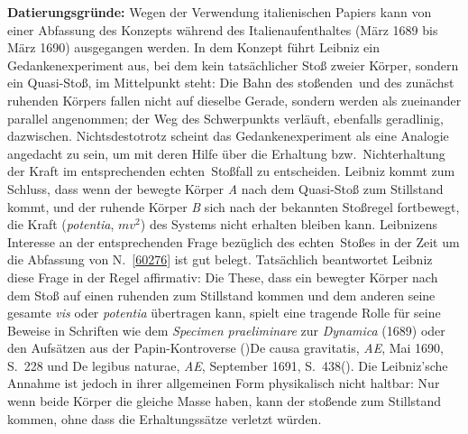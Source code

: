\begin{ledgroup}
\footnotesize
\pstart
\noindent%
\textbf{Datierungsgründe:}
Wegen der Verwendung italienischen Papiers kann von einer Abfassung des Konzepts während des Italienaufenthaltes (März 1689 bis März 1690) ausgegangen werden.
%
\pend
%
\pstart
In dem Konzept führt Leibniz ein Gedankenexperiment aus, bei dem kein tatsächlicher Stoß zweier Körper,
%
sondern ein \glqq Quasi-Stoß\grqq, im Mittelpunkt steht: 
%
Die Bahn des \glqq stoßenden\grqq\  und des zunächst ruhenden Körpers fallen nicht auf dieselbe Gerade,
%
sondern werden als zueinander parallel angenommen; 
%
der Weg des Schwerpunkts verläuft, ebenfalls geradlinig, dazwischen.
%
Nichtsdestotrotz scheint das Gedankenexperiment als eine Analogie angedacht zu sein,
%
um mit deren Hilfe über die Erhaltung bzw.\ Nichterhaltung der Kraft im entsprechenden \glqq echten\grqq\ Stoßfall zu entscheiden.
%
Leibniz kommt zum Schluss, dass wenn der bewegte Körper \textit{A} nach dem Quasi-Stoß
%
zum Stillstand kommt, und der ruhende Körper \textit{B} sich nach der bekannten Stoßregel fortbewegt,
%
die Kraft (\textit{potentia}, $mv^2$) des Systems nicht erhalten bleiben kann.
%
Leibnizens Interesse an der entsprechenden Frage bezüglich des \glqq echten\grqq\ Stoßes in der Zeit um
%
die Abfassung von N.~\ref{60276} ist gut belegt. 
%
Tatsächlich beantwortet Leibniz diese Frage in der Regel affirmativ: Die These, dass ein bewegter Körper 
%
nach dem Stoß auf einen ruhenden zum Stillstand kommen und dem anderen seine gesamte \textit{vis} oder \textit{potentia} übertragen kann,
%
spielt eine tragende Rolle für seine Beweise in Schriften wie dem
%
\textit{Specimen praeliminare} zur \cite{01354}\textit{Dynamica} (1689)
oder den Aufsätzen aus der \protect{}Papin-Kontroverse 
%
(\protect\vphantom)\cite{02040}\glqq De causa gravitatis\grqq, \cite{01023}\textit{AE}, Mai 1690, S.~228 und  \cite{02041}\glqq De legibus naturae\grqq, \cite{01023}\textit{AE}, September 1691, S.~438\protect\vphantom().
%
Die Leibniz'sche Annahme ist jedoch in ihrer allgemeinen Form physikalisch nicht haltbar: Nur wenn beide Körper die gleiche Masse haben,
%
kann der stoßende zum Stillstand kommen, ohne dass die Erhaltungssätze verletzt würden.
%
\pend 
\end{ledgroup}
%
%
\frenchspacing
\vspace{8mm}
\pstart%
\normalsize%
\noindent%
%
